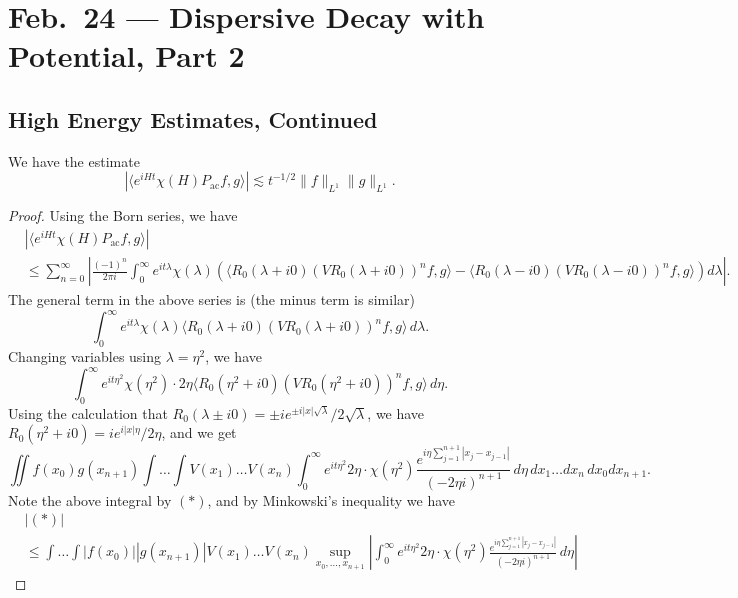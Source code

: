 \chapter{Feb.~24 --- Dispersive Decay with Potential, Part 2}

\section{High Energy Estimates, Continued}
\begin{prop}
  We have the estimate
  \[
    |\langle e^{iH t} \chi(H) P_{\mathrm{ac}} f, g \rangle|
    \lesssim t^{-1 / 2} \|f\|_{L^1} \|g\|_{L^1}.
  \]
\end{prop}

\begin{proof}
  Using the Born series, we have
  \begin{align*}
    &|\langle e^{iH t} \chi(H) P_{\mathrm{ac}} f, g \rangle| \\
    &\le \sum_{n = 0}^\infty \left|
    \frac{(-1)^n}{2\pi i} \int_0^\infty e^{it\lambda} \chi(\lambda) \left(
      \langle R_0(\lambda + i0) (V R_0(\lambda + i0))^n f, g \rangle
      - \langle R_0(\lambda - i0) (V R_0(\lambda - i0))^n f, g \rangle
    \right) d\lambda
    \right|.
  \end{align*}
  The general term in the above series is
  (the minus term is similar)
  \[
    \int_0^\infty e^{it\lambda} \chi(\lambda)
    \langle R_0(\lambda + i0) (V R_0(\lambda + i0))^n f, g \rangle\, d\lambda.
  \]
  Changing variables using $\lambda = \eta^2$, we have
  \[
    \int_0^\infty e^{it \eta^2} \chi(\eta^2) \cdot 2\eta
    \langle R_0(\eta^2 + i0) (V R_0(\eta^2 + i0))^n f, g \rangle\, d\eta.
  \]
  Using the calculation that
  $R_0(\lambda \pm i 0) = \pm i e^{\pm i |x| \sqrt{\lambda}} / 2\sqrt{\lambda}$,
  we have $R_0(\eta^2 + i 0) = i e^{i|x| \eta} / 2\eta$,
  and we get
  \[
    \iint f(x_0) g(x_{n + 1})
    \int \dots \int V(x_1) \dots V(x_n)
    \int_0^\infty e^{it\eta^2} 2\eta \cdot \chi(\eta^2)
    \frac{e^{i \eta \sum_{j = 1}^{n + 1} |x_j - x_{j - 1}|}}{(-2\eta i)^{n + 1}}\, d\eta\, dx_1 \dots dx_n\, dx_0 dx_{n + 1}.
  \]
  Note the above integral by $(*)$, and by Minkowski's
  inequality we have
  \begin{align*}
    &|(*)| \\
    &\le
    \int \dots \int |f(x_0)| |g(x_{n + 1})| V(x_1) \dots V(x_n)
    \sup_{x_0, \dots, x_{n + 1}} \left| \int_0^\infty e^{it\eta^2} 2\eta \cdot \chi(\eta^2) \frac{e^{i \eta \sum_{j = 1}^{n + 1} |x_j - x_{j - 1}|}}{(-2\eta i)^{n + 1}}\, d\eta \right|

\end{align*}
\end{proof}
